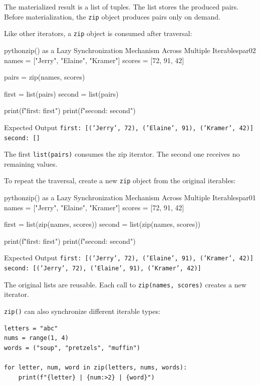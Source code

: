 The materialized result is a list of tuples. The list stores the produced pairs. Before materialization, the \texttt{zip} object produces pairs only on demand.

Like other iterators, a \texttt{zip} object is consumed after traversal:

\begin{codebox}[]{python}{zip() as a Lazy Synchronization Mechanism Across Multiple Iterables}{par02}
names = ["Jerry", "Elaine", "Kramer"]
scores = [72, 91, 42]

pairs = zip(names, scores)

first = list(pairs)
second = list(pairs)

print(f"first: {first}")
print(f"second: {second}")
\end{codebox}


\begin{iobox}{Expected Output}
\texttt{first: [('Jerry', 72), ('Elaine', 91), ('Kramer', 42)]} \\
\texttt{second: []} \\
\end{iobox}


The first \texttt{list(pairs)} consumes the zip iterator. The second one receives no remaining values.

To repeat the traversal, create a new \texttt{zip} object from the original iterables:

\begin{codebox}[]{python}{zip() as a Lazy Synchronization Mechanism Across Multiple Iterables}{par01}
names = ["Jerry", "Elaine", "Kramer"]
scores = [72, 91, 42]

first = list(zip(names, scores))
second = list(zip(names, scores))

print(f"first: {first}")
print(f"second: {second}")
\end{codebox}


\begin{iobox}{Expected Output}
\texttt{first: [('Jerry', 72), ('Elaine', 91), ('Kramer', 42)]} \\
\texttt{second: [('Jerry', 72), ('Elaine', 91), ('Kramer', 42)]} \\
\end{iobox}


The original lists are reusable. Each call to \texttt{zip(names, scores)} creates a new iterator.

\texttt{zip()} can also synchronize different iterable types:

\begin{verbatim}
letters = "abc"
nums = range(1, 4)
words = ("soup", "pretzels", "muffin")

for letter, num, word in zip(letters, nums, words):
    print(f"{letter} | {num:>2} | {word}")
\end{verbatim}

